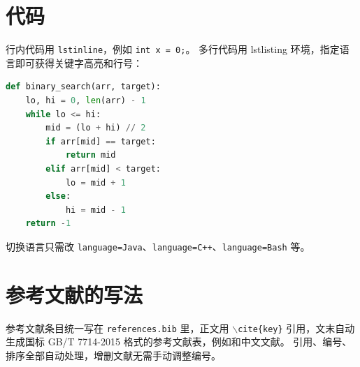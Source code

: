 \documentclass[11pt,a4paper]{article}
\theoremstyle{definition}
\theoremstyle{remark}
\begin{document}
\section{代码}

行内代码用 \texttt{lstinline}，例如 \lstinline{int x = 0;}。
多行代码用 lstlisting 环境，指定语言即可获得关键字高亮和行号：

\begin{lstlisting}[language=Python, caption={Python 示例：二分查找}]
def binary_search(arr, target):
    lo, hi = 0, len(arr) - 1
    while lo <= hi:
        mid = (lo + hi) // 2
        if arr[mid] == target:
            return mid
        elif arr[mid] < target:
            lo = mid + 1
        else:
            hi = mid - 1
    return -1
\end{lstlisting}

切换语言只需改 \texttt{language=Java}、\texttt{language=C++}、\texttt{language=Bash} 等。

\section{参考文献的写法}

参考文献条目统一写在 \texttt{references.bib} 里，正文用
\texttt{$\backslash$cite\{key\}} 引用，文末自动生成国标 GB/T 7714-2015
格式的参考文献表，例如\cite{tanenbaum2014modern}和中文文献\cite{yan2008wcdd}。
引用、编号、排序全部自动处理，增删文献无需手动调整编号。

\printbibliography[heading=bibintoc,title=参考文献]
\end{document}
